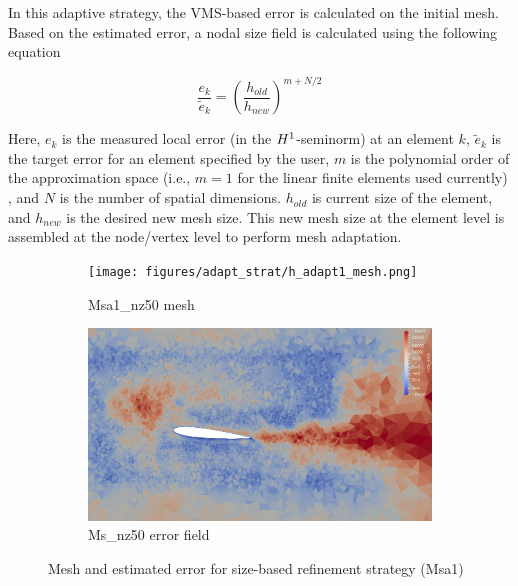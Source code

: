 In this adaptive strategy, the VMS-based error is calculated on the initial mesh. Based on the estimated error, a nodal size field is calculated using the following equation \cite{zhang19}

\begin{equation}
\frac{e_k}{\tilde{e}_k} = \left(\frac{h_{old}}{h_{new}}\right)^{m+N/2} 
\label{eq:diez}
\end{equation}

Here, $e_k$ is the measured local error (in the $H^{1}$-seminorm) at an element $k$, $\tilde{e}_k$ is the target error for an element specified by the user, $m$ is the polynomial order of the approximation space (i.e., $m=1$ for the linear finite elements used currently) , and $N$ is the number of spatial dimensions. $h_{old}$ is current size of the element, and $h_{new}$ is the desired new mesh size.
This new mesh size at the element level is assembled at the node/vertex level to perform mesh adaptation.

\begin{figure}[H]
\centering

\begin{subfigure}[b]{0.475\textwidth}
\centering
\texttt{[image: figures/adapt\_strat/h\_adapt1\_mesh.png]}
\caption{Msa1\_nz50 mesh}
\label{fig:h_adapt1_mesh}
\end{subfigure}
\begin{subfigure}[b]{0.475\textwidth}
\centering
\includegraphics[width=1\textwidth]{figures/adapt_strat/h_adapt1_error_plot.png}
\caption{Ms\_nz50 error field}
\label{fig:h_adapt1_error_plot}
\end{subfigure}

\caption{Mesh and estimated error for size-based refinement strategy (Msa1)}
\end{figure}


